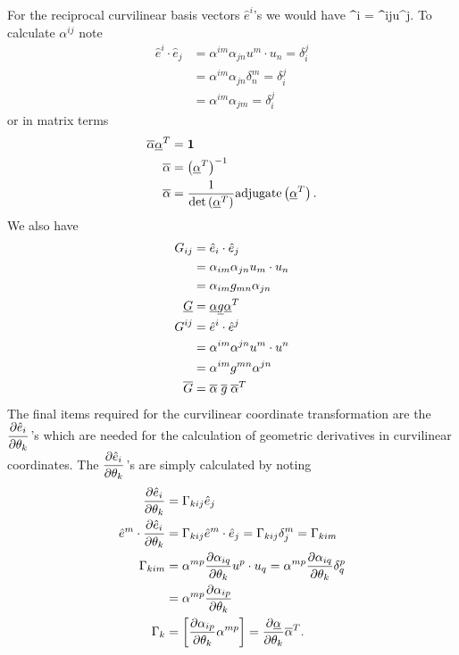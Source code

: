 For the reciprocal curvilinear basis vectors $\hat{e}^{i}$'s we would have
\be
	 \f{^{i}}{\bm{\theta}} = \f{\alpha^{ij}}{\bm{\theta}}u^{j}.
\ee
To calculate $\alpha^{ij}$ note
\begin{align}
	\hat{e}^{i}\cdot \hat{e}_{j} &= \alpha^{im}\alpha_{jn} u^{m}\cdot u_{n} = \delta_{i}^{j}\\
	                 &= \alpha^{im}\alpha_{jn}\delta_{n}^{m} = \delta_{i}^{j}\\
	                 &= \alpha^{im}\alpha_{jm} = \delta_{i}^{j}
\end{align}
or in matrix terms
\begin{align}
	\overline{\alpha}\underline{\alpha}^{T} &= \bm{1} \\
	\overline{\alpha} &= \left ( {\underline{\alpha}^{T}} \right )^{-1} \\
	\overline{\alpha} &= \displaystyle\frac{1}{{\det}\left ( {\underline{\alpha}^{T}} \right )}{\mbox{adjugate}}\left ( {\underline{\alpha}^{T}} \right ).
\end{align}
We also have
\begin{align}
	G_{ij} &= \hat{e}_{i}\cdot \hat{e}_{j} \\
	       &= \alpha_{im}\alpha_{jn}u_{m}\cdot u_{n} \\
	       &= \alpha_{im}g_{mn}\alpha_{jn} \\
	\underline{G}    &= \underline{\alpha}\underline{g}\underline{\alpha}^{T} \\
	G^{ij} &= \hat{e}^{i}\cdot \hat{e}^{j} \\
	       &= \alpha^{im}\alpha^{jn}u^{m}\cdot u^{n} \\
	       &= \alpha^{im}g^{mn}\alpha^{jn} \\
	\overline{G}    &= \overline{\alpha}\;\overline{g}\;\overline{\alpha}^{T}
\end{align}
The final items required for the curvilinear coordinate transformation are the $\displaystyle\frac{\partial{\hat{e}_{i}}}{\partial{\theta_{k}}}$'s which are needed for
the calculation of geometric derivatives in curvilinear coordinates.  The $\displaystyle\frac{\partial{\hat{e}_{i}}}{\partial{\theta_{k}}}$'s are simply calculated by
noting
\begin{align}
	\displaystyle\frac{\partial{\hat{e}_{i}}}{\partial{\theta_{k}}} &= \Gamma_{kij}\hat{e}_{j} \\
	\hat{e}^{m}\cdot\displaystyle\frac{\partial{\hat{e}_{i}}}{\partial{\theta_{k}}} &= \Gamma_{kij}\hat{e}^{m}\cdot \hat{e}_{j} =  \Gamma_{kij}\delta^{m}_{j} =  \Gamma_{kim} \\
	\Gamma_{kim} &= \alpha^{mp}\displaystyle\frac{\partial{\alpha_{iq}}}{\partial{\theta_{k}}}u^{p}\cdot u_{q} = \alpha^{mp}\displaystyle\frac{\partial{\alpha_{iq}}}{\partial{\theta_{k}}}\delta^{p}_{q} \\
	             &= \alpha^{mp}\displaystyle\frac{\partial{\alpha_{ip}}}{\partial{\theta_{k}}} \\
	\Gamma_{k}   &= \left [ {\displaystyle\frac{\partial{\alpha_{ip}}}{\partial{\theta_{k}}}\alpha^{mp}}\right ] = \displaystyle\frac{\partial{\underline{\alpha}}}{\partial{\theta_{k}}}\overline{\alpha}^{T}.
\end{align}
